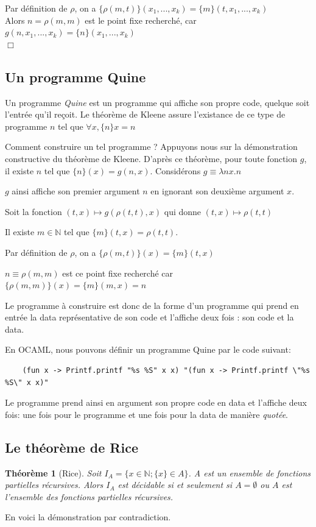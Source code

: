 \documentclass[11pt]{book}
\newtheorem{theoreme}{Théorème}
\begin{document}
Par définition de $\rho$, on a $\{ \rho(m,t)\}(x_1,...,x_k)=\{m\}(t,x_1,...,x_k)$ \\
Alors $n=\rho(m,m)$ est le point fixe recherché, car
$g(n,x_1,...,x_k)=\{n\}(x_1,...,x_k)$ \\ $ \Box $


\subsection{Un programme Quine}
Un programme \textit{Quine} est un programme qui affiche son propre code, quelque soit l'entrée qu'il reçoit.
Le théorème de Kleene assure l'existance de ce type de programme $n$ tel que $\forall x, \{n\}x=n $

Comment construire un tel programme ?
Appuyons nous sur la démonstration constructive du théorème de Kleene.
D'après ce théorème, pour toute fonction $g$, il existe $n$ tel que $\{n\}(x)=g(n,x)$. 
Considérons $g\equiv \lambda nx.n$


$g$ ainsi affiche son premier argument $n$ en ignorant son deuxième argument $x$.

Soit la fonction $(t,x) \mapsto g(\rho(t,t),x)$ qui donne $(t,x) \mapsto \rho(t,t)$


Il existe $m \in \mathbb{N}$ tel que $\{m\}(t,x)=\rho(t,t)$.

Par définition de $\rho$, on a $\{ \rho(m,t)\}(x)=\{ m \}(t,x)$


$n\equiv \rho(m,m)$ est ce point fixe recherché car $ \{ \rho(m,m)\} (x) = \{ m \} (m,x) = n $

Le programme à construire est donc de la forme d'un programme qui prend en entrée la data représentative de son code
et l'affiche deux fois : son code et la data.

En OCAML, nous pouvons définir un programme Quine par le code suivant:
\begin{Verbatim}
	(fun x -> Printf.printf "%s %S" x x) "(fun x -> Printf.printf \"%s %S\" x x)"	
\end{Verbatim}
Le programme prend ainsi en argument son propre code en data et l'affiche deux fois: une fois pour le programme 
et une fois pour la data de manière \textit{quotée}. 

\subsection{Le théorème de Rice}
\begin{theoreme}[Rice]
Soit $I_A=\{ x \in \mathbb{N}; \{x\} \in A \}$. A est un ensemble de fonctions partielles récursives. Alors 
$I_A$ est décidable si et seulement si $A=\emptyset$ ou $A$ est l'ensemble des fonctions partielles récursives.
\end{theoreme}
En voici la démonstration par contradiction.
\end{document}
